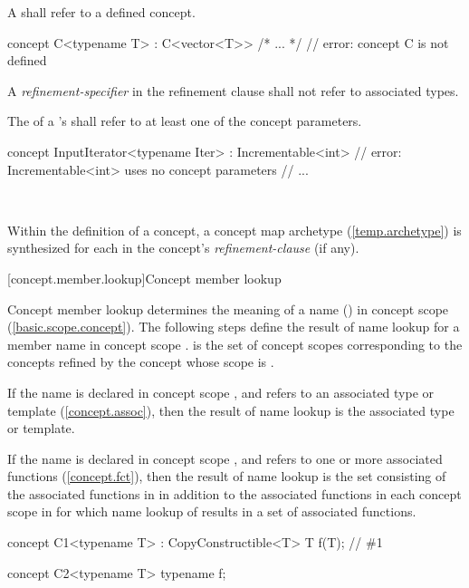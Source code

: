 \documentclass[american]{book}
\begin{document}
\begin{paras}
\pnum
A  shall refer to a defined concept. \enterexample\
\begin{codeblock}
concept C<typename T> : C<vector<T>> {/* ... */ } // error: concept C is not defined
\end{codeblock}
\textcolor{addclr}{\exitexample}

\pnum
A \emph{refinement-specifier} in the refinement clause shall not refer
  to associated types.

\pnum
The  of a
's  shall refer to at
  least one of the concept parameters. \enterexample\ 
\begin{codeblock}
concept InputIterator<typename Iter> 
  : Incrementable<int>  // error: Incrementable<int> uses no concept parameters
{
  // ...
}
\end{codeblock} 
\exitexample\

\pnum 
Within the definition of a concept, a concept map archetype
(\ref{temp.archetype}) is synthesized for each
\techterm{refinement-specifier} in the concept's
\emph{refinement-clause} (if any).

[concept.member.lookup]{Concept member lookup}

\pnum
Concept member lookup determines the meaning of a name
() in concept scope
(\ref{basic.scope.concept}). The following steps define the result of
name lookup for a member name \tcode{f} in concept scope
. \tcode{C$_R$} is the set of concept scopes corresponding to
the concepts refined by the concept whose scope is \tcode{C}.

\pnum
If the name  is declared in concept scope , and
 refers to an associated type or template
(\ref{concept.assoc}), then the result of name lookup is the
associated type or template.

\pnum
If the name  is declared in concept scope , and
 refers to one or more associated functions
(\ref{concept.fct}), then the result of name lookup is the set
consisting of the associated functions in \tcode{C} in addition to the
associated functions in each concept scope
in \tcode{C$_R$} for which
name lookup of \tcode{f} results in a set
  of associated functions. \enterexample\
\begin{codeblock}
concept C1<typename T> : CopyConstructible<T> {
  T f(T); // \#1
}

concept C2<typename T> {
  typename f;
}


\end{codeblock}
\end{paras}
\end{document}
